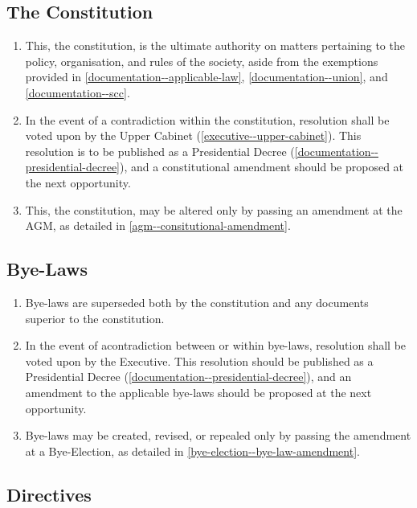 \documentclass{scrartcl}
\begin{document}
        \subsection{The Constitution}
            \label{documentation--constitution}
            \begin{enumerate}
                \item This, the constitution, is the ultimate authority on matters pertaining to the policy, organisation, and rules of the society, aside from the exemptions provided in \ref{documentation--applicable-law}, \ref{documentation--union}, and \ref{documentation--scc}.
                \item In the event of a contradiction within the constitution, resolution shall be voted upon by the Upper Cabinet (\ref{executive--upper-cabinet}). This resolution is to be published as a Presidential Decree (\ref{documentation--presidential-decree}), and a constitutional amendment should be proposed at the next opportunity.
                \item This, the constitution, may be altered only by passing an amendment at the AGM, as detailed in \ref{agm--consitutional-amendment}.
            \end{enumerate}

        \subsection{Bye-Laws}
            \label{documentation--bye-law}
            \begin{enumerate}
                \item Bye-laws are superseded both by the constitution and any documents superior to the constitution.
                \item In the event of acontradiction between or within bye-laws, resolution shall be voted upon by the Executive. This resolution should be published as a Presidential Decree (\ref{documentation--presidential-decree}), and an amendment to the applicable bye-laws should be proposed at the next opportunity.
                \item Bye-laws may be created, revised, or repealed only by passing the amendment at a Bye-Election, as detailed in \ref{bye-election--bye-law-amendment}.
            \end{enumerate}

        \subsection{Directives}
            \label{documentation--directive}
\end{document}

